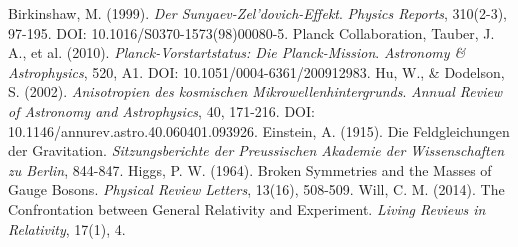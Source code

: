 \documentclass[12pt,a4paper]{article}
\begin{document}
\begin{thebibliography}{99}
		 Birkinshaw, M. (1999). \textit{Der Sunyaev-Zel'dovich-Effekt}. \textit{Physics Reports}, 310(2-3), 97-195. DOI: 10.1016/S0370-1573(98)00080-5.
		 Planck Collaboration, Tauber, J. A., et al. (2010). \textit{Planck-Vorstartstatus: Die Planck-Mission}. \textit{Astronomy \& Astrophysics}, 520, A1. DOI: 10.1051/0004-6361/200912983.
		 Hu, W., \& Dodelson, S. (2002). \textit{Anisotropien des kosmischen Mikrowellenhintergrunds}. \textit{Annual Review of Astronomy and Astrophysics}, 40, 171-216. DOI: 10.1146/annurev.astro.40.060401.093926.
		 Einstein, A. (1915). Die Feldgleichungen der Gravitation. \textit{Sitzungsberichte der Preussischen Akademie der Wissenschaften zu Berlin}, 844-847.
		 Higgs, P. W. (1964). Broken Symmetries and the Masses of Gauge Bosons. \textit{Physical Review Letters}, 13(16), 508-509.
		 Will, C. M. (2014). The Confrontation between General Relativity and Experiment. \textit{Living Reviews in Relativity}, 17(1), 4.
	\end{thebibliography}
	
\end{document}
